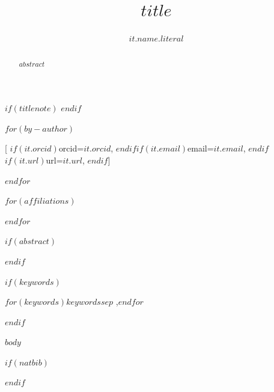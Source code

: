 \documentclass[$for(classoption)$$classoption$$sep$,$endfor$]{ceurart}
\begin{document}


\title{$title$}
$if(titlenote)$
\tnotemark[1]
$endif$

$for(by-author)$
\author[$for(it.affiliations)$$it.number$$sep$,$endfor$]{$it.name.literal$}[%
$if(it.orcid)$orcid=$it.orcid$,%
$endif$$if(it.email)$email=$it.email$,%
$endif$$if(it.url)$url=$it.url$,%
$endif$]

$endfor$

$for(affiliations)$
\address[$it.number$]{$it.name$$if(it.city)$, $it.city$$endif$$if(it.country)$, $it.country$$endif$}
$endfor$

$if(abstract)$
\begin{abstract}
$abstract$
\end{abstract}
$endif$

$if(keywords)$
\begin{keywords}
$for(keywords)$$keywords$$sep$ \sep $endfor$
\end{keywords}
$endif$

\maketitle

$body$

$if(natbib)$


$endif$
\end{document}
